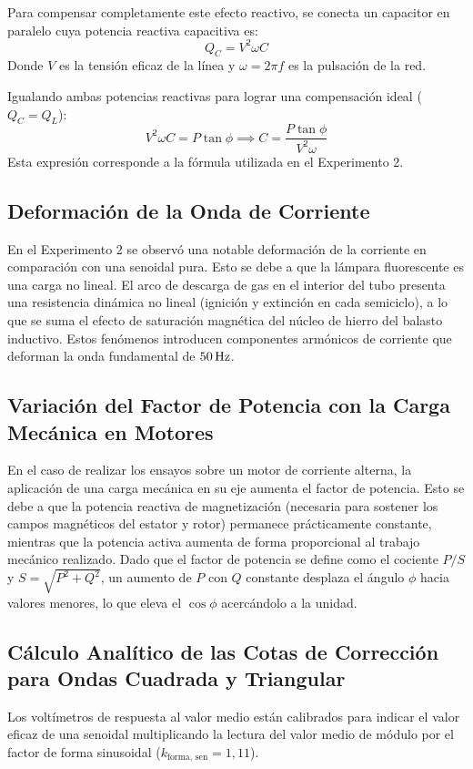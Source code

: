Para compensar completamente este efecto reactivo, se conecta un capacitor en paralelo cuya potencia reactiva
capacitiva es:
\begin{equation}
    Q_C = V^2 \omega C
\end{equation}
Donde $V$ es la tensión eficaz de la línea y $\omega = 2\pi f$ es la pulsación de la red.

Igualando ambas potencias reactivas para lograr una compensación ideal ($Q_C = Q_L$):
\begin{equation}
    V^2 \omega C = P \tan\phi \implies C = \frac{P \tan\phi}{V^2 \omega}
\end{equation}
Esta expresión corresponde a la fórmula utilizada en el Experimento 2.


\subsection{Deformación de la Onda de Corriente}
En el Experimento 2 se observó una notable deformación de la corriente en comparación con una senoidal pura. Esto
se debe a que la lámpara fluorescente es una carga no lineal. El arco de descarga de gas en el interior del tubo
presenta una resistencia dinámica no lineal (ignición y extinción en cada semiciclo), a lo que se suma el efecto de
saturación magnética del núcleo de hierro del balasto inductivo. Estos fenómenos introducen componentes armónicos de
corriente que deforman la onda fundamental de $50\,\mathrm{Hz}$.


\subsection{Variación del Factor de Potencia con la Carga Mecánica en Motores}
En el caso de realizar los ensayos sobre un motor de corriente alterna, la aplicación de una carga mecánica en su eje
aumenta el factor de potencia. Esto se debe a que la potencia reactiva de magnetización (necesaria para sostener los
campos magnéticos del estator y rotor) permanece prácticamente constante, mientras que la potencia activa aumenta de
forma proporcional al trabajo mecánico realizado. Dado que el factor de potencia se define como el cociente $P/S$
y $S = \sqrt{P^2 + Q^2}$, un aumento de $P$ con $Q$ constante desplaza el ángulo $\phi$ hacia valores menores, lo
que eleva el $\cos\phi$ acercándolo a la unidad.


\subsection{Cálculo Analítico de las Cotas de Corrección para Ondas Cuadrada y Triangular}
Los voltímetros de respuesta al valor medio están calibrados para indicar el valor eficaz de una senoidal multiplicando
la lectura del valor medio de módulo por el factor de forma sinusoidal ($k_{\text{forma, sen}} = 1,11$).

